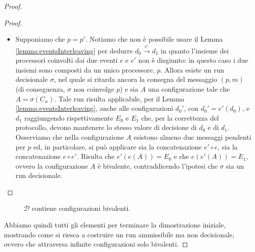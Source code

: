 \documentclass{article}
\begin{document}
\begin{proof}
\begin{proof}
\begin{itemize}
\item Supponiamo che $p=p'$. Notiamo che non \`e possibile usare il
  Lemma \ref{lemma:eventsInterleaving} per dedurre $d_0
  \xrightarrow{e'} d_1$ in quanto l'insieme dei processori coinvolti
  dai due eventi $e$ e $e'$ non \`e disgiunto: in questo caso i due
  insiemi sono composti da un unico processore, $p$. Allora esiste un
  run decisionale $\sigma$, nel quale si ritarda ancora la consegna
  del messaggio $(p,m)$ (di conseguenza, $\sigma$ non coinvolge $p$) e
  sia $A$ una configurazione tale che $A=\sigma(C_{\alpha})$. Tale run
  risulta applicabile, per il Lemma \ref{lemma:eventsInterleaving},
  anche alle configurazioni $d_0'$, con $d_0' = e'(d_0)$, e $d_1$
  raggiungendo rispettivamente $E_0$ e $E_1$ che, per la correttezza
  del protocollo, devono mantenere lo stesso valore di decisione di
  $d_0$ e di $d_1$. Osserviamo che nella configurazione $A$ esistono
  almeno due messaggi pendenti per $p$ ed, in particolare, si pu\`o
  applicare sia la concatenazione $e' \circ e$, sia la concatenazione
  $e \circ e'$. Risulta che $e'(e(A))=E_0$ e che $e(e'(A))=E_1$,
  ovvero la configurazione $A$ è bivalente, contraddicendo l'ipotesi
  che $\sigma$ sia un run decisionale.
\end{itemize} 
\end{proof}
\begin{figure}[!h]
  \centering \caption{$\mathcal{D}$ contiene configurazioni bivalenti.}\label{fig:vicine}
\end{figure}

Abbiamo quindi tutti gli elementi per terminare la dimostrazione
iniziale, mostrando come si riesca a costruire un run ammissibile ma
non decisionale, ovvero che attraversa infinite
configurazioni solo bivalenti.


\end{proof}
\end{document}
